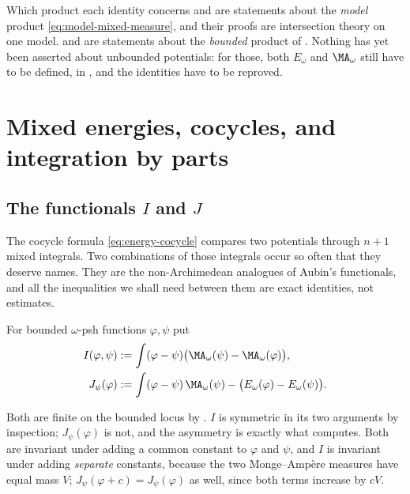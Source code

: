 \begin{warning}{Which product each identity concerns}
 and  are statements about
the \emph{model} product \eqref{eq:model-mixed-measure}, and their proofs are
intersection theory on one model.   and
 are statements about the \emph{bounded}
product of .  Nothing has yet been asserted
about unbounded potentials: for those, both \(E_\omega\) and
\(\MA_\omega\) still have to be defined, in
, and the identities have to
be reproved.
\end{warning}

\section{Mixed energies, cocycles, and integration by parts}
\label{sec:ch26-mixed}

\subsection{The functionals \texorpdfstring{\(I\)}{I} and
\texorpdfstring{\(J\)}{J}}
\label{sec:ch26-ij-def}

The cocycle formula \eqref{eq:energy-cocycle} compares two potentials through
\(n+1\) mixed integrals.  Two combinations of those integrals occur so often
that they deserve names.  They are the non-Archimedean analogues of Aubin's
functionals, and all the inequalities we shall need between them are exact
identities, not estimates.

\begin{definition}
\label{def:ch26-ij}
For bounded \(\omega\)-psh functions \(\varphi,\psi\) put
\begin{align}
\label{eq:ch26-I-definition}
 I(\varphi,\psi)
 &:=\int(\varphi-\psi)\bigl(\MA_\omega(\psi)-\MA_\omega(\varphi)\bigr),\\
\label{eq:ch26-J-definition}
 J_\psi(\varphi)
 &:=\int(\varphi-\psi)\,\MA_\omega(\psi)
    -\bigl(E_\omega(\varphi)-E_\omega(\psi)\bigr).
\end{align}
\end{definition}

Both are finite on the bounded locus by
.  \(I\) is symmetric in its two arguments
by inspection; \(J_\psi(\varphi)\) is not, and the asymmetry is exactly what
 computes.  Both are invariant under
adding a common constant to \(\varphi\) and \(\psi\), and \(I\) is invariant
under adding \emph{separate} constants, because the two Monge--Amp\`ere
measures have equal mass \(V\); \(J_\psi(\varphi+c)=J_\psi(\varphi)\) as
well, since both terms increase by \(cV\).

